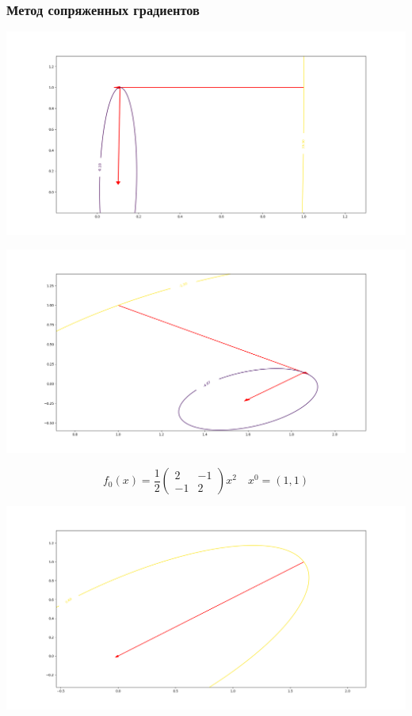 \documentclass[english]{article}
\begin{document}
\subsubsection{Метод сопряженных градиентов}
\begin{center}
    \includegraphics[scale=0.3]{plots/traectories/conjugate_gradient_1.png}
\end{center}
\begin{center}
    \includegraphics[scale=0.3]{plots/traectories/conjugate_gradient_2.png}
\end{center}
\[ f_0(x) = \frac{1}{2}\begin{pmatrix}2 & -1 \\ -1 & 2\end{pmatrix}x^2 \quad x^0 = (1, 1) \]
\begin{center}
    \includegraphics[scale=0.3]{plots/traectories/conjugate_gradient_3.png}
\end{center}
\end{document}
